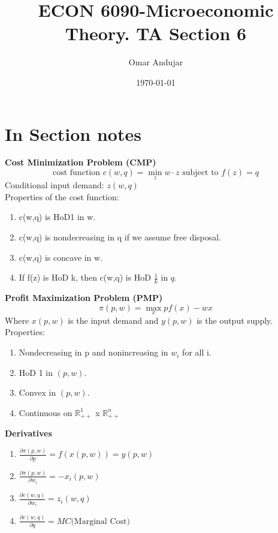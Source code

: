 \documentclass{article}
\title{ECON 6090-Microeconomic Theory. TA Section 6}
\author{Omar Andujar}
\date{\today}
\begin{document}
\raggedright
\pagestyle{fancy}
\fancyhf{}

\maketitle %

\section*{In Section notes}
\textbf{Cost Minimization Problem (CMP)}\\
\[\text{cost function } c(w,q) = \min_z w \cdot z \text{ subject to } f(z) = q\]
Conditional input demand: $z(w,q)$\\
\bigskip
Properties of the cost function:
\begin{enumerate}
    \item c(w,q) is HoD1 in w.
    \item c(w,q) is nondecreasing in q if we assume free disposal.
    \item c(w,q) is concave in w.
    \item If f(z) is HoD k, then c(w,q) is HoD $\frac{1}{k}$ in $q$.
\end{enumerate}
\textbf{Profit Maximization Problem (PMP)}\\
\[\pi(p,w) = \max_x pf(x) -wx\]
Where $x(p,w)$ is the input demand and $y(p,w)$ is the output supply.\\
\bigskip
Properties:
\begin{enumerate}
    \item Nondecreasing in p and nonincreasing in $w_i$ for all i.
    \item HoD 1 in $(p,w)$.
    \item Convex in $(p,w)$.
    \item Continuous on $\mathbb{R}_{++}^1$ x $\mathbb{R}_{++}^n$
\end{enumerate}
\textbf{Derivatives}
\begin{enumerate}
    \item $\frac{\partial \pi(p,w)}{\partial p} = f(x(p,w)) = y(p,w)$
    \item $\frac{\partial \pi(p,w)}{\partial w_i} = -x_i(p,w)$
    \item $\frac{\partial c(w,q)}{\partial w_i} = z_i(w,q)$
    \item $\frac{\partial c(w,q)}{\partial q} = MC \text{(Marginal Cost)}$
\end{enumerate}
\end{document}
